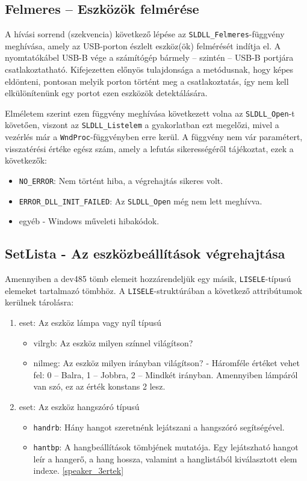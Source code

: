 \documentclass[tocnopagenum]{thesis-ekf}
\begin{document}
	\subsection{Felmeres -- Eszközök felmérése}
	A hívási sorrend (szekvencia) következő lépése az \verb*|SLDLL_Felmeres|-függvény meghívása, amely az USB-porton észlelt eszköz(ök) felmérését indítja el. A nyomtatókábel USB-B vége a számítógép bármely -- szintén -- USB-B portjára csatlakoztatható. Kifejezetten előnyös tulajdonsága a metódusnak, hogy képes eldönteni, pontosan melyik porton történt meg a csatlakoztatás, így nem kell elkülönítenünk egy portot ezen eszközök detektálására.
	
	Elméletem szerint ezen függvény meghívása következett volna az \verb*|SLDLL_Open|-t követően, viszont az \verb*|SLDLL_Listelem| a gyakorlatban ezt megelőzi, mivel a vezérlés már a \verb*|WndProc|-függvényben erre kerül.  A függvény nem vár paramétert, visszatérési értéke egész szám, amely a lefutás sikerességéről tájékoztat, ezek a következők:
	\begin{itemize}
		\item \verb*|NO_ERROR|: Nem történt hiba, a végrehajtás sikeres volt.
		\item \verb*|ERROR_DLL_INIT_FAILED|: Az \verb*|SLDLL_Open| még nem lett meghívva.
		\item egyéb - Windows műveleti hibakódok.
	\end{itemize}
	\subsection{SetLista - Az eszközbeállítások végrehajtása}
	Amennyiben a dev485 tömb elemeit hozzárendeljük egy másik, \verb*|LISELE|-típusú elemeket tartalmazó tömbhöz. A \verb*|LISELE|-struktúrában a következő attribútumok kerülnek tárolásra: 
	\begin{enumerate}
		\item eset: Az eszköz lámpa vagy nyíl típusú
		\begin{itemize}
			\item vilrgb: Az eszköz milyen színnel világítson?
			\item nilmeg: Az eszköz milyen irányban világítson? - Háromféle értéket vehet fel: 0 -- Balra, 1 -- Jobbra, 2 -- Mindkét irányban. Amennyiben lámpáról van szó, ez az érték konstans 2 lesz.
		\end{itemize}
		\item eset: Az eszköz hangszóró típusú
		\begin{itemize}
			\item \verb*|handrb|: Hány hangot szeretnénk lejátszani a hangszóró segítségével.
			\item \verb*|hantbp|: A hangbeállítások tömbjének mutatója. Egy lejátszható hangot leír a hangerő, a hang hossza, valamint a hanglistából kiválasztott elem indexe. \ref{speaker_3ertek}
		\end{itemize}
	\end{enumerate}
\end{document}

